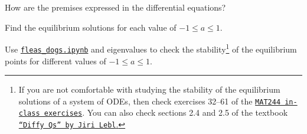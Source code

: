 \begin{slide}
\begin{parts}
	\item How are the premises expressed in the differential equations?
	\item Find the equilibrium solutions for each value of $-1 \leq a \leq 1$.
	\item Use \href{https://utoronto.syzygy.ca/jupyter/user-redirect/git-pull?repo=https://github.com/bigfatbernie/IBLMathModeling&subPath=book/python/fleas_dogs.ipynb}{\tt fleas_dogs.ipynb} and eigenvalues to check the stability\footnote{If you are not comfortable with studying the stability of the equilibrium solutions of a system of ODEs, then check exercises 32--61 of the \href{https://raw.githubusercontent.com/siefkenj/IBLODEs/main/dist/odes.pdf}{\texttt{MAT244 in-class exercises}}. You can also check sections 2.4 and 2.5 of the textbook \href{https://raw.githubusercontent.com/siefkenj/IBLODEs/main/diffyqs-by-jiri-lebl/diffyqs.pdf}{\texttt{``Diffy Qs'' by Jiri Lebl}.}} of the equilibrium points for different values of $-1 \leq a \leq 1$.
\end{parts}




\end{slide}








